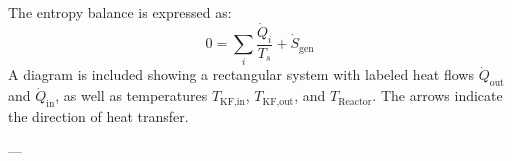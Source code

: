 The entropy balance is expressed as:  
\[
0 = \sum_i \frac{\dot{Q}_i}{T_s} + \dot{S}_{\text{gen}}
\]  
A diagram is included showing a rectangular system with labeled heat flows \( \dot{Q}_{\text{out}} \) and \( \dot{Q}_{\text{in}} \), as well as temperatures \( T_{\text{KF,in}} \), \( T_{\text{KF,out}} \), and \( T_{\text{Reactor}} \). The arrows indicate the direction of heat transfer.

---